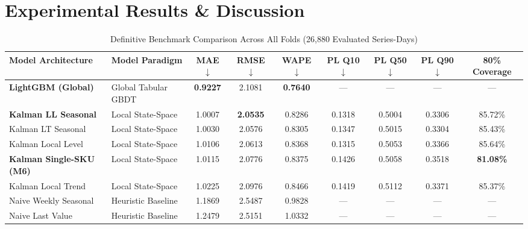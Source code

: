 \documentclass[conference]{IEEEtran}
\begin{document}
\section{Experimental Results \& Discussion}

\begin{table}[t]
\caption{Definitive Benchmark Comparison Across All Folds (26,880 Evaluated Series-Days)}
\centering
\begin{tabular}{llccccccc}
\toprule
\textbf{Model Architecture} & \textbf{Model Paradigm} & \textbf{MAE $\downarrow$} & \textbf{RMSE $\downarrow$} & \textbf{WAPE $\downarrow$} & \textbf{PL Q10 $\downarrow$} & \textbf{PL Q50 $\downarrow$} & \textbf{PL Q90 $\downarrow$} & \textbf{80\% Coverage} \\
\midrule
\textbf{LightGBM (Global)} & Global Tabular GBDT & \textbf{0.9227} & 2.1081 & \textbf{0.7640} & --- & --- & --- & --- \\
\textbf{Kalman LL Seasonal} & Local State-Space & 1.0007 & \textbf{2.0535} & 0.8286 & 0.1318 & 0.5004 & 0.3306 & 85.72\% \\
Kalman LT Seasonal & Local State-Space & 1.0030 & 2.0576 & 0.8305 & 0.1347 & 0.5015 & 0.3304 & 85.43\% \\
Kalman Local Level & Local State-Space & 1.0106 & 2.0613 & 0.8368 & 0.1315 & 0.5053 & 0.3366 & 85.64\% \\
\textbf{Kalman Single-SKU (M6)} & Local State-Space & 1.0115 & 2.0776 & 0.8375 & 0.1426 & 0.5058 & 0.3518 & \textbf{81.08\%} \\
Kalman Local Trend & Local State-Space & 1.0225 & 2.0976 & 0.8466 & 0.1419 & 0.5112 & 0.3371 & 85.37\% \\
Naive Weekly Seasonal & Heuristic Baseline & 1.1869 & 2.5487 & 0.9828 & --- & --- & --- & --- \\
Naive Last Value & Heuristic Baseline & 1.2479 & 2.5151 & 1.0332 & --- & --- & --- & --- \\
\bottomrule
\end{tabular}
\label{tab:master_benchmark}
\end{table}
\end{document}
